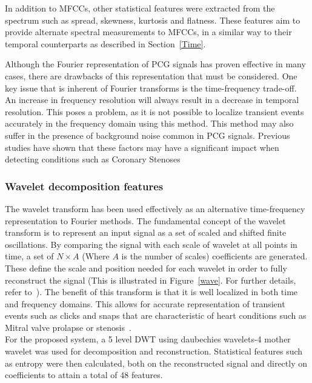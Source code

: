 \documentclass[titlepage, 12pt]{scrartcl} \usepackage{enumitem}
\begin{document}
In addition to MFCCs, other statistical features were extracted from the
spectrum such as spread, skewness, kurtosis and flatness. These features aim to
provide alternate spectral measurements to MFCCs, in a similar way to their
temporal counterparts as described in Section~\ref{Time}.

Although the Fourier representation of PCG signals has proven effective in many
cases, there are drawbacks of this representation that must be considered. One
key issue that is inherent of Fourier transforms is the time-frequency
trade-off. An increase in frequency resolution will always result in a decrease
in temporal resolution. This poses a problem, as it is not possible to localize
transient events accurately in the frequency domain using this method. This
method may also suffer in the presence of background noise common in PCG
signals. Previous studies have shown that these factors may have a significant
impact when detecting conditions such as Coronary
Stenoses~\parencite{Ergen2001, Akay1990}

\subsubsection{Wavelet decomposition features}
The wavelet transform has been used effectively as an alternative
time-frequency representation to Fourier methods. The fundamental concept of
the wavelet transform is to represent an input signal as a set of scaled and
shifted finite oscillations. By comparing the signal with each scale of wavelet
at all points in time, a set of $N\times A$ (Where $A$ is the number of scales)
coefficients are generated. These define the scale and position needed for
each wavelet in order to fully reconstruct the signal (This is illustrated in Figure~\ref{wave}. For further details,
refer to~\parencite{Polikar1994}). The benefit of this transform is that it is
well localized in both time and frequency domains. This allows for accurate
representation of transient events such as clicks and snaps that are
characteristic of heart conditions such as Mitral valve prolapse or
stenosis~\parencite{Brown2008}.\\
For the proposed system, a 5 level DWT using daubechies wavelets-4 mother wavelet was
used for decomposition and reconstruction. Statistical features such as entropy
were then calculated, both on the reconstructed signal and directly on
coefficients to attain a total of 48 features.~\parencite{Homsi2016}
\end{document}
